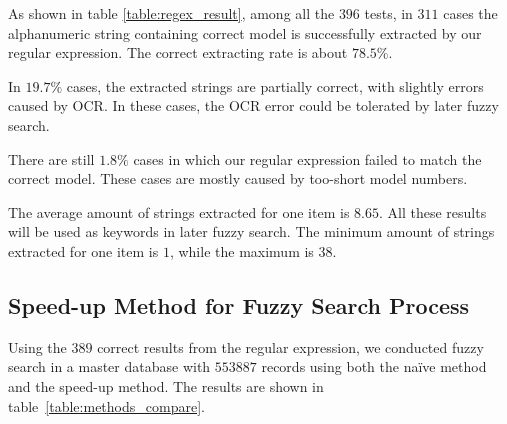 \documentclass[technicalreport]{ieicej}
\begin{document}
        As shown in table \ref{table:regex_result}, among all the $396$ tests, in $311$ cases the alphanumeric string containing correct model is successfully extracted by our regular expression. The correct extracting rate is about $78.5\%$.
        
        In $19.7\%$ cases, the extracted strings are partially correct, with slightly errors caused by OCR. In these cases, the OCR error could be tolerated by later fuzzy search.
        
        There are still $1.8\%$ cases in which our regular expression failed to match the correct model. These cases are mostly caused by too-short model numbers.
        
        The average amount of strings extracted for one item is $8.65$. All these results will be used as keywords in later fuzzy search. The minimum amount of strings extracted for one item is $1$, while the maximum is $38$.



    \subsection{Speed-up Method for Fuzzy Search Process}
            
        Using the $389$ correct results from the regular expression, we conducted fuzzy search in a master database with $553887$ records using both the naïve method and the speed-up method. The results are shown in table~\ref{table:methods_compare}.
\end{document}
